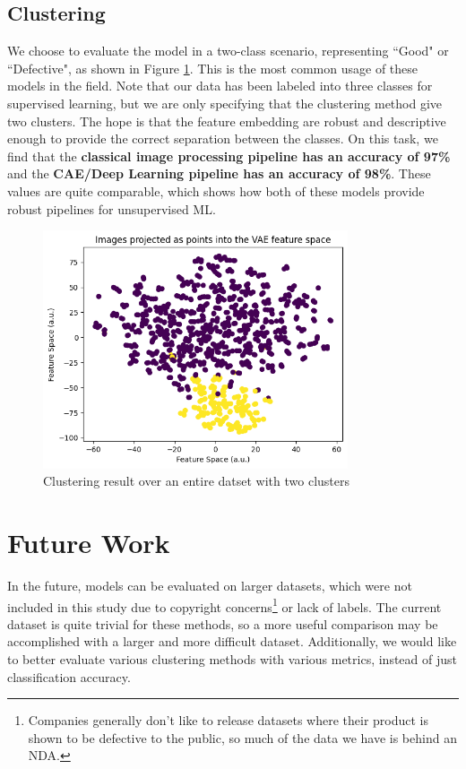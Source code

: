 \documentclass[conference]{IEEEtran}
\begin{document}
\subsection{Clustering}
We choose to evaluate the model in a two-class scenario, representing ``Good" or ``Defective", as shown in Figure \ref{fig:cae_res}.  
This is the most common usage of these models in the field. 
Note that our data has been labeled into three classes for supervised learning, but we are only specifying that the clustering method give two clusters. 
The hope is that the feature embedding are robust and descriptive enough to provide the correct separation between the classes. 
On this task, we find that the \textbf{classical image processing pipeline has an accuracy of 97\%} and the \textbf{CAE/Deep Learning pipeline has an accuracy of 98\%}. 
These values are quite comparable, which shows how both of these models provide robust pipelines for unsupervised ML.

\begin{figure}[h]
    \includegraphics[width=9cm]{whole_dataset.png}
    \centering
    \caption{Clustering result over an entire datset with two clusters}
\label{fig:cae_res}
\end{figure}

\section{Future Work}
In the future, models can be evaluated on larger datasets, which were not included in this study due to copyright concerns\footnote{Companies generally don't like to release datasets where their product is shown to be defective to the public, so much of the data we have is behind an NDA.} or lack of labels. 
The current dataset is quite trivial for these methods, so a more useful comparison may be accomplished with a larger and more difficult dataset. 
Additionally, we would like to better evaluate various clustering methods with various metrics, instead of just classification accuracy.  
\end{document}
